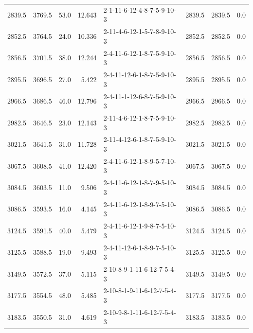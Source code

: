 \begin{tabular}{rrrrlrrr}
 2839.5 &  3769.5 &           53.0 &             12.643 &  2-1-11-6-12-4-8-7-5-9-10-3 &        2839.5 &          2839.5 &       0.0 \\
 2852.5 &  3764.5 &           24.0 &             10.336 &  2-11-4-6-12-1-5-7-8-9-10-3 &        2852.5 &          2852.5 &       0.0 \\
 2856.5 &  3701.5 &           38.0 &             12.244 &  2-4-11-6-12-1-8-7-5-9-10-3 &        2856.5 &          2856.5 &       0.0 \\
 2895.5 &  3696.5 &           27.0 &              5.422 &  2-4-11-12-6-1-8-7-5-9-10-3 &        2895.5 &          2895.5 &       0.0 \\
 2966.5 &  3686.5 &           46.0 &             12.796 &  2-4-11-1-12-6-8-7-5-9-10-3 &        2966.5 &          2966.5 &       0.0 \\
 2982.5 &  3646.5 &           23.0 &             12.143 &  2-11-4-6-12-1-8-7-5-9-10-3 &        2982.5 &          2982.5 &       0.0 \\
 3021.5 &  3641.5 &           31.0 &             11.728 &  2-11-4-12-6-1-8-7-5-9-10-3 &        3021.5 &          3021.5 &       0.0 \\
 3067.5 &  3608.5 &           41.0 &             12.420 &  2-4-11-6-12-1-8-9-5-7-10-3 &        3067.5 &          3067.5 &       0.0 \\
 3084.5 &  3603.5 &           11.0 &              9.506 &  2-4-11-6-12-1-8-7-9-5-10-3 &        3084.5 &          3084.5 &       0.0 \\
 3086.5 &  3593.5 &           16.0 &              4.145 &  2-4-11-6-12-1-8-9-7-5-10-3 &        3086.5 &          3086.5 &       0.0 \\
 3124.5 &  3591.5 &           40.0 &              5.479 &  2-4-11-6-12-1-9-8-7-5-10-3 &        3124.5 &          3124.5 &       0.0 \\
 3125.5 &  3588.5 &           19.0 &              9.493 &  2-4-11-12-6-1-8-9-7-5-10-3 &        3125.5 &          3125.5 &       0.0 \\
 3149.5 &  3572.5 &           37.0 &              5.115 &  2-10-8-9-1-11-6-12-7-5-4-3 &        3149.5 &          3149.5 &       0.0 \\
 3177.5 &  3554.5 &           48.0 &              5.485 &  2-10-8-1-9-11-6-12-7-5-4-3 &        3177.5 &          3177.5 &       0.0 \\
 3183.5 &  3550.5 &           31.0 &              4.619 &  2-10-9-8-1-11-6-12-7-5-4-3 &        3183.5 &          3183.5 &       0.0 \\

\end{tabular}
